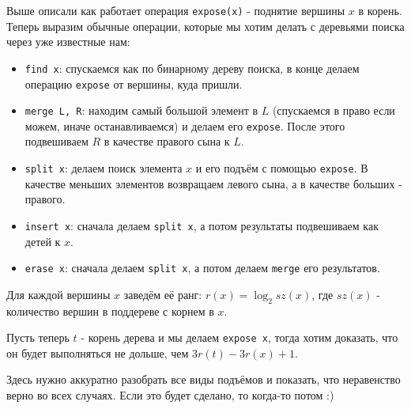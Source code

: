 Выше описали как работает операция \texttt{expose(x)} - поднятие вершины $x$ в корень. Теперь выразим обычные операции, которые мы хотим делать с деревьями поиска через уже известные нам:
\begin{itemize}
    \item \texttt{find x}: спускаемся как по бинарному дереву поиска, в конце делаем операцию \texttt{expose} от вершины, куда пришли.
    \item \texttt{merge L, R}: находим самый большой элемент в $L$ (спускаемся в право если можем, иначе останавливаемся) и делаем его \texttt{expose}. После этого подвешиваем $R$ в качестве правого сына к $L$.
    \item \texttt{split x}: делаем поиск элемента $x$ и его подъём с помощью \texttt{expose}. В качестве меньших элементов возвращаем левого сына, а в качестве больших - правого.
    \item \texttt{insert x}: сначала делаем \texttt{split x}, а потом результаты подвешиваем как детей к $x$.
    \item \texttt{erase x}: сначала делаем \texttt{split x}, а потом делаем \texttt{merge} его результатов.
\end{itemize}


Для каждой вершины $x$ заведём её ранг: $r(x) = \log_2 sz(x)$, где $sz(x)$ - количество вершин в поддереве с корнем в $x$.

Пусть теперь $t$ - корень дерева и мы делаем \texttt{expose x}, тогда хотим доказать, что он будет выполняться не дольше, чем $3r(t) - 3r(x) + 1$.

Здесь нужно аккуратно разобрать все виды подъёмов и показать, что неравенство верно во всех случаях. Если это будет сделано, то когда-то потом :)
